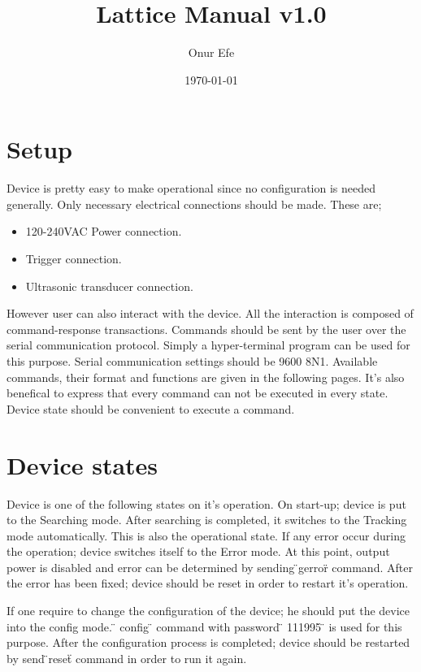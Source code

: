 \documentclass{article}
\title{Lattice Manual v1.0} %
\author{Onur Efe}
\date{\today} %
\begin{document}
\maketitle %

\section{Setup}
Device is pretty easy to make operational since no configuration is needed generally. 
Only necessary electrical connections should be made. These are;

\begin{itemize}
      \item 120-240VAC Power connection.
      \item Trigger connection.
      \item Ultrasonic transducer connection.
\end{itemize}

However user can also interact with the device. All the interaction is composed of command-response
transactions. Commands should be sent by the user over the serial communication protocol.
Simply a hyper-terminal program can be used for this purpose. Serial 
communication settings should be 9600 8N1. Available commands, their format and functions are
given in the following pages. It's also benefical to express that every command can not be executed
in every state. Device state should be convenient to execute a command. 

\section{Device states}
Device is one of the following states on it's operation. On start-up; device is put to the Searching
mode. After searching is completed, it switches to the Tracking mode automatically. This is also the 
operational state. If any error occur during the operation; device switches itself to the Error mode.
At this point, output power is disabled and error can be determined by sending \"{}gerror\"{} command.    
After the error has been fixed; device should be reset in order to restart it's operation.

If one require to change the configuration of the device; he should put the device into the config mode. 
\"{} config \"{} command with password \"{} 111995 \"{} is used for this purpose. After the configuration
process is completed; device should be restarted by send \"{}reset\"{} command in order to run it again.
\end{document}
